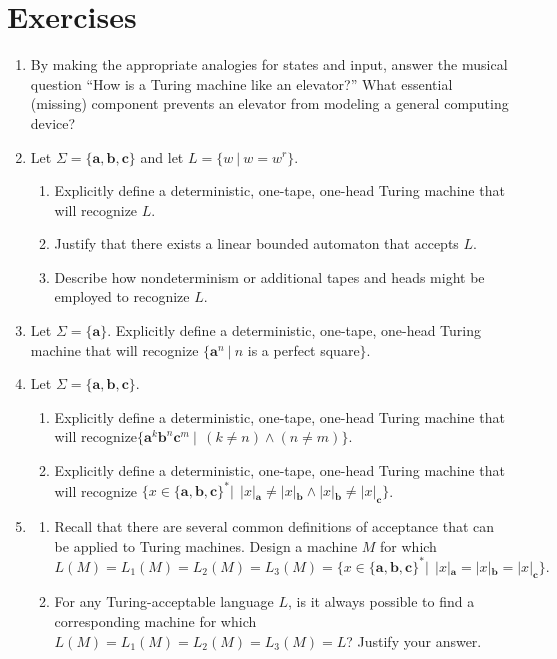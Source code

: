 \section*{Exercises}
\begin{enumerate}[{11.}1.]
\item By making the appropriate analogies for states and input, answer the
musical question ``How is a Turing machine like an elevator?'' What essential
(missing) component prevents an elevator from modeling a general computing
device?

\item Let $\Sigma=\{\pmb{a},\pmb{b},\pmb{c}\}$ and let $L=\{w\ |\ w=w^r\}$.
\begin{enumerate}
\item Explicitly define a deterministic, one-tape, one-head Turing machine that
will recognize $L$.
\item Justify that there exists a linear bounded automaton that accepts $L$.
\item Describe how nondeterminism or additional tapes and heads might be
employed to recognize $L$.
\end{enumerate}

\item Let $\Sigma=\{\pmb{a}\}$. Explicitly define a deterministic, one-tape,
one-head Turing machine that will recognize $\{\pmb{a}^n\ |\ n$ is a perfect
square$\}$.

\item Let $\Sigma=\{\pmb{a},\pmb{b},\pmb{c}\}$.
\begin{enumerate}
\item Explicitly define a deterministic, one-tape, one-head Turing machine that
will recognize\linebreak $\{\pmb{a}^k\pmb{b}^n\pmb{c}^m\ |\ \ (k\not= n)\wedge(n\not= m)\}$.
\item Explicitly define a deterministic, one-tape, one-head Turing machine that
will recognize $\{x\in\{\pmb{a},\pmb{b},\pmb{c}\}^*|\ \ |x|_{\pmb{a}}\not=|x|_{
\pmb{b}}\wedge |x|_{\pmb{b}}\not=|x|_{\pmb{c}}\}$.
\end{enumerate}

\item \begin{enumerate}
\item Recall that there are several common definitions of acceptance that
can be applied to Turing machines. Design a machine $M$ for which
\[ L(M)=L_1(M)=L_2(M)=L_3(M)=\{x\in\{\pmb{a},\pmb{b},\pmb{c}\}^*|\ \ |x|_{\pmb{a}}
	=|x|_{\pmb{b}}=|x|_{\pmb{c}}\}. \]
\item For any Turing-acceptable language $L$, is it always possible to find a
corresponding machine for which $L(M)=L_1(M)=L_2(M)=L_3(M)=L$? Justify your
answer.
\end{enumerate}


\end{enumerate}
